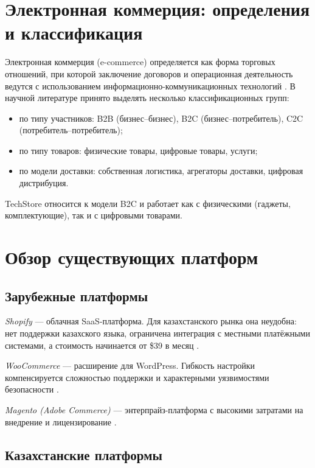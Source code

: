 \documentclass[14pt,a4paper]{extreport}
\begin{document}
\section{Электронная коммерция: определения и классификация}

Электронная коммерция (e-commerce) определяется как форма торговых отношений, при которой заключение договоров и операционная деятельность ведутся с использованием информационно-коммуникационных технологий \cite{turban2018}. В научной литературе принято выделять несколько классификационных групп:

\begin{itemize}
  \item по типу участников: B2B (бизнес--бизнес), B2C (бизнес--потребитель), C2C (потребитель--потребитель);
  \item по типу товаров: физические товары, цифровые товары, услуги;
  \item по модели доставки: собственная логистика, агрегаторы доставки, цифровая дистрибуция.
\end{itemize}

TechStore относится к модели B2C и работает как с физическими (гаджеты, комплектующие), так и с цифровыми товарами.

\section{Обзор существующих платформ}

\subsection{Зарубежные платформы}

\textit{Shopify} --- облачная SaaS-платформа. Для казахстанского рынка она неудобна: нет поддержки казахского языка, ограничена интеграция с местными платёжными системами, а стоимость начинается от \$39 в месяц \cite{shopify2024}.

\textit{WooCommerce} --- расширение для WordPress. Гибкость настройки компенсируется сложностью поддержки и характерными уязвимостями безопасности \cite{woocommerce2024}.

\textit{Magento (Adobe Commerce)} --- энтерпрайз-платформа с высокими затратами на внедрение и лицензирование \cite{adobe2024}.

\subsection{Казахстанские платформы}
\end{document}
